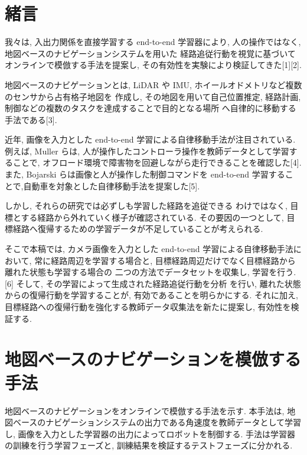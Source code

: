 \documentclass{jarticle}
\begin{document}
\date{} 

\maketitle
\thispagestyle{empty}
\pagestyle{empty}

\small

\section{緒言}
我々は, 入出力関係を直接学習する end-to-end 学習器により,
人の操作ではなく, 地図ベースのナビゲーションシステムを用いた
経路追従行動を視覚に基づいてオンラインで模倣する手法を提案し,
その有効性を実験により検証してきた[1][2].

地図ベースのナビゲーションとは, LiDAR や IMU, ホイールオドメトリなど複数のセンサから占有格子地図を
作成し, その地図を用いて自己位置推定, 経路計画, 制御などの複数のタスクを達成することで目的となる場所
へ自律的に移動する手法である[3].

近年, 画像を入力とした end-to-end 学習による自律移動手法が注目されている.
例えば, Muller らは, 人が操作したコントローラ操作を教師データとして学習することで, 
オフロード環境で障害物を回避しながら走行できることを確認した[4].
また, Bojarski らは画像と人が操作した制御コマンドを end-to-end 学習するこ
とで,自動車を対象とした自律移動手法を提案した[5].

しかし, それらの研究では必ずしも学習した経路を追従できる
わけではなく, 目標とする経路から外れていく様子が確認されている.
その要因の一つとして, 目標経路へ復帰するための学習データが不足していることが考えられる.

そこで本稿では, カメラ画像を入力とした end-to-end 学習による自律移動手法において,
常に経路周辺を学習する場合と, 目標経路周辺だけでなく目標経路から離れた状態も学習する場合の
二つの方法でデータセットを収集し, 学習を行う.[6] そして, その学習によって生成された経路追従行動を分析
を行い, 離れた状態からの復帰行動を学習することが, 有効であることを明らかにする. それに加え, 
目標経路への復帰行動を強化する教師データ収集法を新たに提案し, 有効性を検証する.

 
\section{地図ベースのナビゲーションを模倣する手法}
地図ベースのナビゲーションをオンラインで模倣する手法を示す.
本手法は, 地図ベースのナビゲーションシステムの出力である角速度を教師データとして学習し, 
画像を入力とした学習器の出力によってロボットを制御する. 
手法は学習器の訓練を行う学習フェーズと, 訓練結果を検証するテストフェーズに分かれる.
\end{document}

